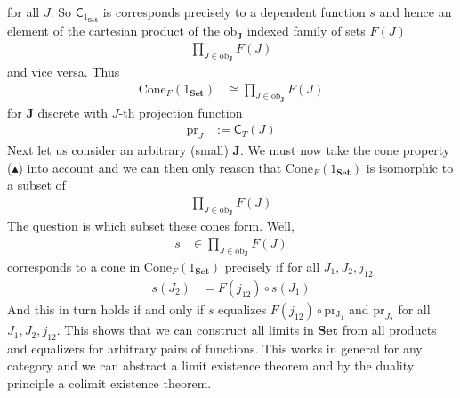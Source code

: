 for all $J$. So $\mathsf{C}_{1_{\mathbf{Set}}}$ is corresponds precisely to a dependent function $s$ and hence an element of the cartesian product of the $\mathrm{ob}_{\mathbf{J}}$ indexed family of sets $F(J)$
\begin{align*}
  \prod_{J \in \mathrm{ob}_{\mathbf{J}}}
  F(J)
\end{align*}
and vice versa. Thus
\begin{align*}
  \mathrm{Cone}_{F}(1_{\mathbf{Set}})
  &\cong
  \prod_{J \in \mathrm{ob}_{\mathbf{J}}}
  F(J)
\end{align*}
for $\mathbf{J}$ discrete with $J$-th projection function
\begin{align*}
  \mathrm{pr}_{J}
  &:=
  \mathsf{C}_{T}(J)
\end{align*}
Next let us consider an arbitrary (small) $\mathbf{J}$. We must now take the cone property ($\blacktriangle$) into account and we can then only reason that $\mathrm{Cone}_{F}(1_{\mathbf{Set}})$ is isomorphic to a subset of
\begin{align*}
  \prod_{J \in \mathrm{ob}_{\mathbf{J}}}
  F(J)
\end{align*}
The question is which subset these cones form. Well,
\begin{align*}
  s
  &\in
  \prod_{J \in \mathrm{ob}_{\mathbf{J}}}
  F(J)
\end{align*}
corresponds to a cone in $\mathrm{Cone}_{F}(1_{\mathbf{Set}})$ precisely if for all $J_{1},J_{2},j_{12}$
\begin{align*}
  s(J_{2})
  &=
  F(j_{12})
  \circ
  s(J_{1})
\end{align*}
And this in turn holds if and only if $s$ equalizes $F(j_{12}) \circ \mathrm{pr_{J_{1}}}$ and $\mathrm{pr}_{J_{2}}$ for all $J_{1},J_{2},j_{12}$. This shows that we can construct all limits in $\mathbf{Set}$ from all products and equalizers for arbitrary pairs of functions. This works in general for any category and we can abstract a limit existence theorem and by the duality principle a colimit existence theorem.
\\
